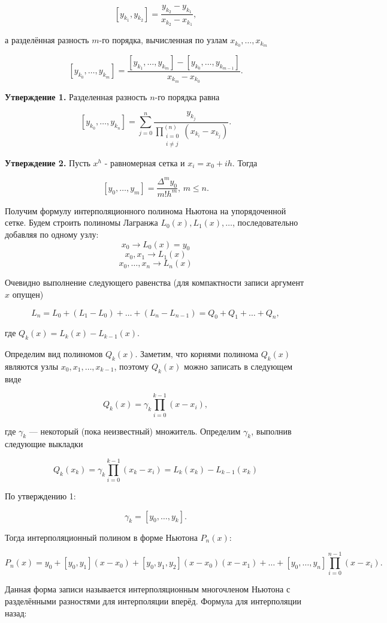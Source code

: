 $$[y_{k_1}, y_{k_2}] = \frac{y_{k_2} - y_{k_1}}{x_{k_2} - x_{k_1}},$$

а разделённая разность \( m \)-го порядка, вычисленная по узлам \( x_{k_0}, \dots, x_{k_m} \)

$$[y_{k_0}, \dots, y_{k_m}] = \frac{[y_{k_1}, \dots, y_{k_m}] - [y_{k_0}, \dots, y_{k_{m-1}}]}{x_{k_m} - x_{k_0}}.$$

\textbf{Утверждение 1.}
Разделенная разность \( n \)-го порядка равна

$$[y_{k_0}, \dots, y_{k_n}] = \sum_{j=0}^n \frac{y_{k_j}}{\prod_{\substack{i=0 \\ i \neq j}}^{(n)} (x_{k_i} - x_{k_j})}.$$

\textbf{Утверждение 2.} Пусть \( x^h \) - равномерная сетка и \( x_i = x_0 + ih \). Тогда

$$[y_0, \dots, y_m] = \frac{\Delta^m y_0}{m! h^m}, \, m \leq n.$$

Получим формулу интерполяционного полинома Ньютона на упорядоченной сетке. Будем строить полиномы Лагранжа \( L_0(x), L_1(x), \dots \), последовательно добавляя по одному узлу:
$$x_0 \to L_0(x) = y_0$$
$$x_0, x_1 \to L_1(x)$$
$$x_0, \dots, x_n \to L_n(x)$$

Очевидно выполнение следующего равенства (для компактности записи аргумент \( x \) опущен)

$$L_n = L_0 + (L_1 - L_0) + \dots + (L_n - L_{n-1}) = Q_0 + Q_1 + \dots + Q_n,$$

где \( Q_k(x) = L_k(x) - L_{k-1}(x) \).

Определим вид полиномов \( Q_k(x) \). Заметим, что корнями полинома \( Q_k(x) \) являются узлы \( x_0, x_1, \dots, x_{k-1} \), поэтому \( Q_k(x) \) можно записать в следующем виде

$$Q_k(x) = \gamma_k \prod_{i=0}^{k-1} (x - x_i),$$

где \( \gamma_k \) — некоторый (пока неизвестный) множитель. Определим \( \gamma_k \), выполнив следующие выкладки

$$Q_k(x_k) = \gamma_k \prod_{i=0}^{k-1} (x_k - x_i) = L_k(x_k) - L_{k-1}(x_k)$$

По утверждению 1:

$$\gamma_k = [y_0, \dots, y_k].$$

Тогда интерполяционный полином в форме Ньютона \( P_n(x) \):

$$P_n(x) = y_0 + [y_0, y_1](x - x_0) + [y_0, y_1, y_2](x - x_0)(x - x_1) + \dots + [y_0, \dots, y_n] \prod_{i=0}^{n-1}(x - x_i).$$

Данная форма записи называется интерполяционным многочленом Ньютона с разделёнными разностями для интерполяции вперёд. Формула для интерполяции назад:

